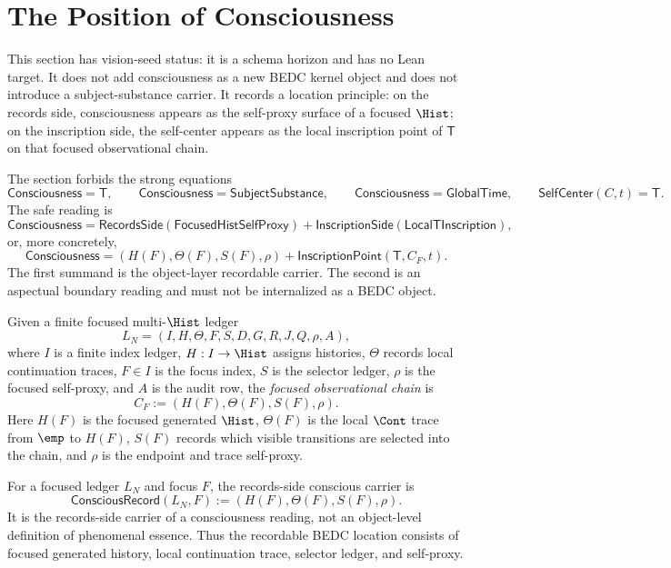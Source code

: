 \section{The Position of Consciousness}
\label{sec:position-of-consciousness}

\begin{remark}
\label{rem:position-consciousness-vision-seed-status}
This section has vision-seed status: it is a schema horizon and has no
Lean target. It does not add consciousness as a new BEDC kernel object and
does not introduce a subject-substance carrier. It records a location
principle: on the records side, consciousness appears as the self-proxy
surface of a focused $\Hist$; on the inscription side, the self-center
appears as the local inscription point of $\mathsf{T}$ on that focused
observational chain.

The section forbids the strong equations
$$
\mathsf{Consciousness}=\mathsf{T},
\qquad
\mathsf{Consciousness}=\mathsf{SubjectSubstance},
\qquad
\mathsf{Consciousness}=\mathsf{GlobalTime},
\qquad
\mathsf{SelfCenter}(C,t)=\mathsf{T}.
$$
The safe reading is
$$
\mathsf{Consciousness}
=
\mathsf{RecordsSide}(\mathsf{FocusedHistSelfProxy})
+
\mathsf{InscriptionSide}(\mathsf{LocalTInscription}),
$$
or, more concretely,
$$
\mathsf{Consciousness}
=
(H(F),\Theta(F),S(F),\rho)
+
\mathsf{InscriptionPoint}(\mathsf{T},C_F,t).
$$
The first summand is the object-layer recordable carrier. The second is an
aspectual boundary reading and must not be internalized as a BEDC object.
\end{remark}

\begin{definition}
\label{def:focused-observational-chain}
Given a finite focused multi-$\Hist$ ledger
$$
L_N=(I,H,\Theta,F,S,D,G,R,J,Q,\rho,A),
$$
where $I$ is a finite index ledger, $H:I\to\Hist$ assigns histories,
$\Theta$ records local continuation traces, $F\in I$ is the focus index,
$S$ is the selector ledger, $\rho$ is the focused self-proxy, and $A$ is
the audit row, the \emph{focused observational chain} is
$$
C_F:=(H(F),\Theta(F),S(F),\rho).
$$
Here $H(F)$ is the focused generated $\Hist$, $\Theta(F)$ is the local
$\Cont$ trace from $\emp$ to $H(F)$, $S(F)$ records which visible
transitions are selected into the chain, and $\rho$ is the endpoint and
trace self-proxy.
\end{definition}

\begin{definition}
\label{def:records-side-conscious-carrier}
For a focused ledger $L_N$ and focus $F$, the records-side conscious
carrier is
$$
\mathsf{ConsciousRecord}(L_N,F)
:=
(H(F),\Theta(F),S(F),\rho).
$$
It is the records-side carrier of a consciousness reading, not an
object-level definition of phenomenal essence. Thus the recordable BEDC
location consists of focused generated history, local continuation trace,
selector ledger, and self-proxy.
\end{definition}

